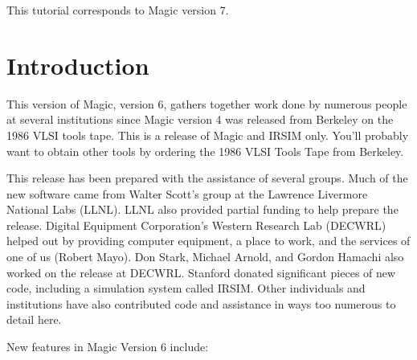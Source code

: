 \documentclass[letterpaper,twoside,12pt]{article}
\def\mytitle{Overview of the DECWRL/Livermore Magic Release (Version~6)}
\begin{document}
\makeatletter
\newcommand{\ps@magic}{%
	\renewcommand{\@oddhead}{\mytitle\hfil\today}%
	\renewcommand{\@evenhead}{\today\hfil\mytitle}%
	\renewcommand{\@evenfoot}{\hfil\textrm{--{\thepage}--}\hfil}%
	\renewcommand{\@oddfoot}{\@evenfoot}}
\newcommand{\ps@mplain}{%
	\renewcommand{\@oddhead}{}%
	\renewcommand{\@evenhead}{}%
	\renewcommand{\@evenfoot}{\hfil\textrm{--{\thepage}--}\hfil}%
	\renewcommand{\@oddfoot}{\@evenfoot}}
\makeatother
\pagestyle{magic}
\thispagestyle{mplain}


\begin{center}
  This tutorial corresponds to Magic version 7. \\
\end{center}
\vspace*{0.5in}

\section{Introduction}

This version of Magic, version 6, 
gathers together work done by numerous people at
several institutions since Magic version 4 was released from Berkeley
on the 1986 VLSI tools tape.  
This is a release of Magic and IRSIM only.  You'll probably want to obtain 
other tools by ordering the 1986 VLSI Tools Tape from Berkeley.

This release has been prepared with the assistance of several groups.
Much of the new software came from Walter Scott's group at
the Lawrence Livermore National Labs (LLNL).
LLNL also provided partial funding to help prepare the release.  
Digital Equipment Corporation's Western Research Lab (DECWRL) 
helped out by providing computer equipment, a place to work, and
the services of one of us (Robert Mayo).  Don Stark, Michael Arnold, and
Gordon Hamachi also worked on the release at DECWRL.
Stanford donated significant pieces of new code, including a simulation
system called IRSIM.
Other individuals and institutions have also contributed code and assistance
in ways too numerous to detail here.

New features in Magic Version 6 include:
\end{document}
